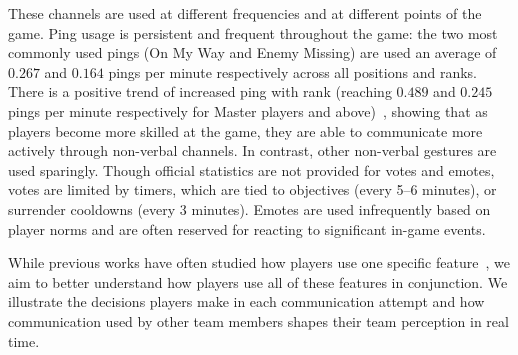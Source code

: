 These channels are used at different frequencies and at different points of the game. Ping usage is persistent and frequent throughout the game: the two most commonly used pings (On My Way and Enemy Missing) are used an average of $0.267$ and $0.164$ pings per minute respectively across all positions and ranks. There is a positive trend of increased ping with rank (reaching $0.489$ and $0.245$ pings per minute respectively for Master players and above)~\cite{log2024ping}, showing that as players become more skilled at the game, they are able to communicate more actively through non-verbal channels. In contrast, other non-verbal gestures are used sparingly. Though official statistics are not provided for votes and emotes, votes are limited by timers, which are tied to objectives (every 5–6 minutes), or surrender cooldowns (every 3 minutes). Emotes are used infrequently based on player norms and are often reserved for reacting to significant in-game events.

While previous works have often studied how players use one specific feature~\cite{tan2022, leavitt2016}, we aim to better understand how players use all of these features in conjunction. We illustrate the decisions players make in each communication attempt and how communication used by other team members shapes their team perception in real time.